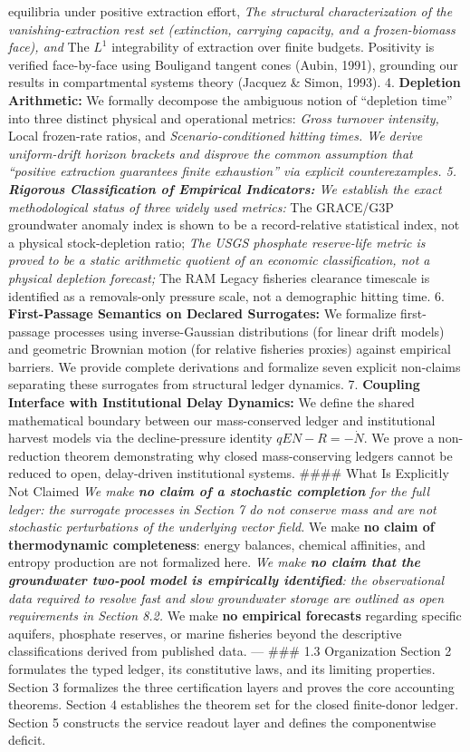 \documentclass[11pt]{article}
\begin{document}
\begin{itemize}
equilibria under positive extraction effort, \emph{ The structural characterization of the vanishing-extraction rest set (extinction, carrying capacity, and a frozen-biomass face), and } The \(L^1\) integrability of extraction over finite budgets. Positivity is verified face-by-face using Bouligand tangent cones (Aubin, 1991), grounding our results in compartmental systems theory (Jacquez \& Simon, 1993). 4. \textbf{Depletion Arithmetic:} We formally decompose the ambiguous notion of ``depletion time'' into three distinct physical and operational metrics: \emph{ Gross turnover intensity, } Local frozen-rate ratios, and \emph{ Scenario-conditioned hitting times. We derive uniform-drift horizon brackets and disprove the common assumption that ``positive extraction guarantees finite exhaustion'' via explicit counterexamples. 5. \textbf{Rigorous Classification of Empirical Indicators:} We establish the exact methodological status of three widely used metrics: } The GRACE/G3P groundwater anomaly index is shown to be a record-relative statistical index, not a physical stock-depletion ratio; \emph{ The USGS phosphate reserve-life metric is proved to be a static arithmetic quotient of an economic classification, not a physical depletion forecast; } The RAM Legacy fisheries clearance timescale is identified as a removals-only pressure scale, not a demographic hitting time. 6. \textbf{First-Passage Semantics on Declared Surrogates:} We formalize first-passage processes using inverse-Gaussian distributions (for linear drift models) and geometric Brownian motion (for relative fisheries proxies) against empirical barriers. We provide complete derivations and formalize seven explicit non-claims separating these surrogates from structural ledger dynamics. 7. \textbf{Coupling Interface with Institutional Delay Dynamics:} We define the shared mathematical boundary between our mass-conserved ledger and institutional harvest models via the decline-pressure identity \(qEN - R = -\dot{N}\). We prove a non-reduction theorem demonstrating why closed mass-conserving ledgers cannot be reduced to open, delay-driven institutional systems. \#\#\#\# What Is Explicitly Not Claimed \emph{ We make \textbf{no claim of a stochastic completion} for the full ledger: the surrogate processes in Section 7 do not conserve mass and are not stochastic perturbations of the underlying vector field. } We make \textbf{no claim of thermodynamic completeness}: energy balances, chemical affinities, and entropy production are not formalized here. \emph{ We make \textbf{no claim that the groundwater two-pool model is empirically identified}: the observational data required to resolve fast and slow groundwater storage are outlined as open requirements in Section 8.2. } We make \textbf{no empirical forecasts} regarding specific aquifers, phosphate reserves, or marine fisheries beyond the descriptive classifications derived from published data. --- \#\#\# 1.3 Organization Section 2 formulates the typed ledger, its constitutive laws, and its limiting properties. Section 3 formalizes the three certification layers and proves the core accounting theorems. Section 4 establishes the theorem set for the closed finite-donor ledger. Section 5 constructs the service readout layer and defines the componentwise deficit. 
\end{itemize}
\end{document}
